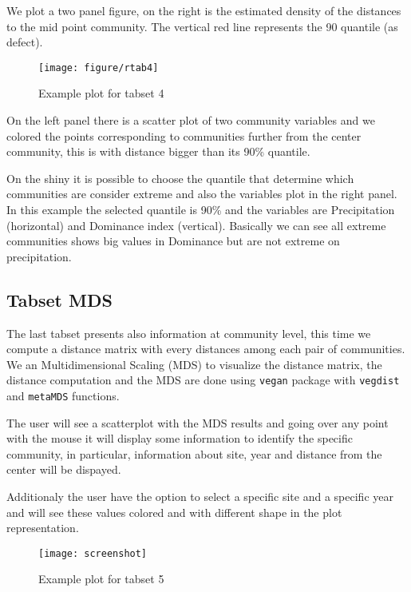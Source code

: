 \documentclass{article}\usepackage[]{graphicx}\usepackage[]{color}
\makeatletter
\def\maxwidth{ %
  \ifdim\Gin@nat@width>\linewidth
    \linewidth
  \else
    \Gin@nat@width
  \fi
}
\newenvironment{knitrout}{}{} %
\makeatother
\begin{document}
We plot a two panel figure, on the right is the estimated density of the distances to the mid point community. The vertical red line represents the 90 quantile (as defect). 
\begin{figure}
\begin{knitrout}
\color{fgcolor}
\texttt{[image: figure/rtab4]} 

\end{knitrout}

\caption{Example plot for tabset 4 \label{tab4}}
\end{figure}

On the left panel there is a scatter plot of two community variables and we colored the points corresponding to communities further from the center community, this is with distance bigger than its 90\% quantile. 

On the shiny it is possible to choose the quantile that determine which communities are consider extreme and also the variables plot in the right panel. In this example the selected quantile is 90\% and the variables are Precipitation (horizontal) and Dominance index (vertical). Basically we can see all extreme communities shows big values in Dominance but are not extreme on precipitation. 

\subsection{Tabset MDS}
The last tabset presents also information at community level, this time we compute a distance matrix with every distances among each pair of communities. We an Multidimensional Scaling (MDS) to visualize the distance matrix, the distance computation and the MDS are done using {\tt vegan} package with {\tt vegdist} and {\tt metaMDS} functions. 

The user will see a scatterplot with the MDS results and going over any point with the mouse it will display some information to identify the specific community, in particular, information about site, year and distance from the center will be dispayed. 

Additionaly the user have the option to select a specific site and a specific year and will see these values colored and with different shape in the plot representation. 

\begin{figure}
\texttt{[image: screenshot]}
\caption{Example plot for tabset 5 \label{tab5}}
\end{figure}
\end{document}
